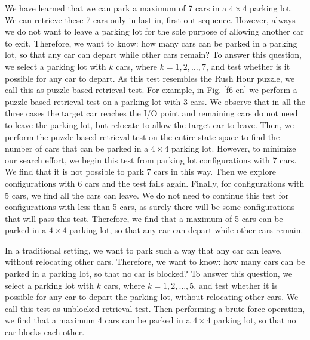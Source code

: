 We have learned that we can park a maximum of 7 cars in a $4 \times 4$ parking lot. We can retrieve these 7 cars only in last-in, first-out sequence. However, always we do not want to leave a parking lot for the sole purpose of allowing another car to exit. Therefore, we want to know: how many cars can be parked in a parking lot, so that any car can depart while other cars remain? To answer this question, we select a parking lot with $k$ cars, where $k = 1,2,\dots,7$, and test whether is it possible for any car to depart. As this test resembles the Rush Hour puzzle, we call this as puzzle-based retrieval test. For example, in Fig. \ref{f6-en} we perform a puzzle-based retrieval test on a parking lot with 3 cars. We observe that in all the three cases the target car reaches the I/O point and remaining cars do not need to leave the parking lot, but relocate to allow the target car to leave. Then, we perform the puzzle-based retrieval test on the entire state space to find the number of cars that can be parked in a $4 \times 4$ parking lot. However, to minimize our search effort, we begin this test from parking lot configurations with 7 cars. We find that it is not possible to park 7 cars in this way. Then we explore configurations with 6 cars and the test fails again. Finally, for configurations with 5 cars, we find all the cars can leave. We do not need to continue this test for configurations with less than 5 cars, as surely there will be some configurations that will pass this test. Therefore, we find that a maximum of 5 cars can be parked in a $4 \times 4$ parking lot, so that any car can depart while other cars remain.

In a traditional setting, we want to park such a way that any car can leave, without relocating other cars. Therefore, we want to know: how many cars can be parked in a parking lot, so that no car is blocked? To answer this question, we select a parking lot with $k$ cars, where $k = 1,2,\dots,5$, and test whether it is possible for any car to depart the parking lot, without relocating other cars. We call this test as unblocked retrieval test. Then performing a brute-force operation, we find that a maximum 4 cars can be parked in a $4 \times 4$ parking lot, so that no car blocks each other.


